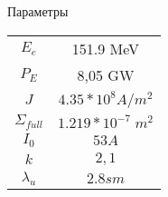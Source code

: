 \documentclass[12pt]{article}
\title{}
\date{}
\author{}
\begin{document}
\begin{center}
Параметры\\
	\begin{tabular}{| c | c |}
		\hline
		$E_e$ & 151.9 MeV \\
		$P_E$ & 8,05 GW \\
		$J$ & $4.35*10^8 A/m^2$ \\
		$\Sigma_{full}$ & $1.219*10^{-7} \; m^2$\\
		$I_0$ & $53 A$\\
		$k$ & $2,1$\\
		$\lambda_{u}$ & $2.8 sm$\\
		\hline
	\end{tabular}\\
\end{center}
\end{document}
